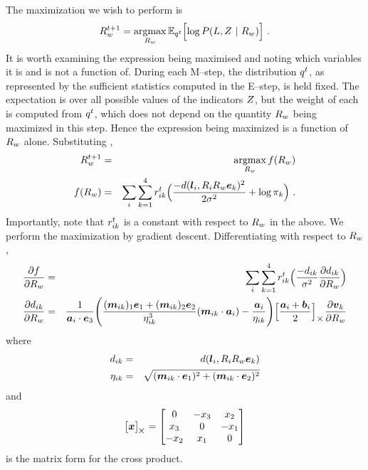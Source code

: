 The maximization we wish to perform is
\begin{equation}
  \label{eq:R-argmax}
  \SceneR^{t+1} = \argmax_{\SceneR}\limits
  \Expected_{\PosteriorEst^t}\Bigl[
    \log P(\LineSegs,\Indicators ~|~ \SceneR) 
  \Bigr] ~.
\end{equation}
It is worth examining the expression being maximised and noting which
variables it is and is not a function of. During each M--step, the
distribution $\PosteriorEst^t$, as represented by the sufficient
statistics computed in the E--step, is held fixed. The expectation is
over all possible values of the indicators $\Indicators$, but the
weight of each is computed from $\PosteriorEst^t$, which does not
depend on the quantity $\SceneR$ being maximized in this step. Hence
the expression being maximized is a function of $\SceneR$
alone. Substituting ,
\begin{eqnarray}
  \SceneR^{t+1} &=& \argmax_{\SceneR}\limits \ErrorFunc(\SceneR) \\
  \ErrorFunc(\SceneR) 
  &=&
  \label{eq:R-error}
  \sum_i \sum_{k=1}^4
  \Resp_{ik}^t
  \Bigl(
    \frac{-\dist(\LineSeg_i, \CamR_i\SceneR\ebasis_k)^2}{2\sigma^2}
    + \log \Mixing_k
  \Bigr)~.
\end{eqnarray}
Importantly, note that $\Resp_{ik}^t$ is a constant with respect to
$\SceneR$ in the above. We perform the maximization
 by gradient descent. Differentiating
 with respect to $\SceneR$,
\begin{eqnarray}
  \Deriv{\ErrorFunc}{\SceneR}
  &=&
  \sum_i \sum_{k=1}^4
  \Resp_{ik}^t
  \Bigl(
    \frac{-\dist_{ik}}{\sigma^2}
    \Deriv{\dist_{ik}}{\SceneR} 
  \Bigr)\\
  \Deriv{\dist_{ik}}{\SceneR} &=&
  \frac{1}{\StartPt_i \cdot \ez} 
  \Biggl(
    \frac
      {(\ReprojLine_{ik})_1\ex + (\ReprojLine_{ik})_2\ey}
      {\eta_{ik}^3}
    (\ReprojLine_{ik} \cdot \StartPt_i)
    -
    \frac{\StartPt_i}{\eta_{ik}}
  \Biggr)
  \Bigl[ \frac{\StartPt_i+\EndPt_i}{2} \Bigr]_{\cross}
  \Deriv{\vpt_k}{\SceneR}
\end{eqnarray} 
where
\begin{eqnarray}
  \dist_{ik} &=& \dist(\LineSeg_i, \CamR_i\SceneR\ebasis_k)\\
  \eta_{ik} &=&
   \sqrt{(\ReprojLine_{ik} \cdot \ex)^2 +
         (\ReprojLine_{ik} \cdot \ey)^2}
\end{eqnarray}
and
\begin{equation}
  \bigl[ \vect{x} \bigr]_{\!\cross} = 
  \begin{bmatrix}
    0 & -x_3 & x_2 \\
    x_3 & 0 & -x_1 \\
    -x_2 & x_1 & 0
  \end{bmatrix}
\end{equation}
is the matrix form for the cross product.

